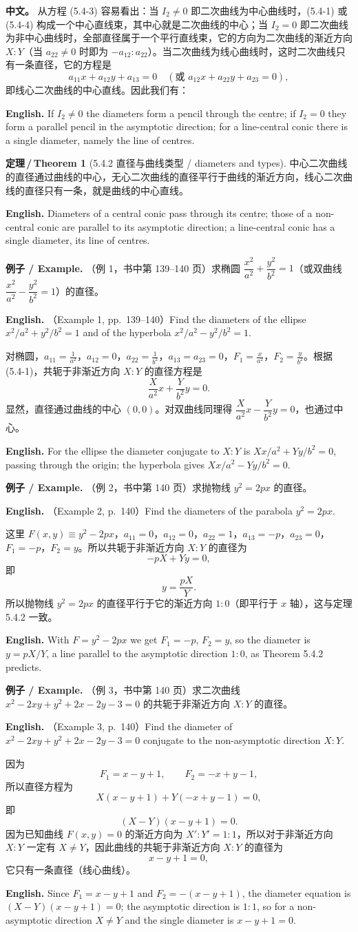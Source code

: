 \documentclass[UTF8,11pt,a4paper]{ctexart}
\newcommand{\APS}[2]{\par\noindent\textbf{中文。} #1\par\noindent\textbf{English.} #2\par\smallskip}
\newcommand{\EN}[1]{\par\noindent \textbf{English.} #1\par}
\newcommand{\EX}[2]{\par\noindent \textbf{例子 / Example.} #1\par\EN{#2}}
\theoremstyle{definition}
\newtheorem*{theorem}{定理\,/\,Theorem}
\begin{document}
\APS{从方程 (5.4-3) 容易看出：当 $I_2\ne0$ 即二次曲线为中心曲线时，(5.4-1) 或 (5.4-4) 构成一个中心直线束，其中心就是二次曲线的中心；当 $I_2=0$ 即二次曲线为非中心曲线时，全部直径属于一个平行直线束，它的方向为二次曲线的渐近方向 $X:Y$（当 $a_{22}\ne0$ 时即为 $-a_{12}:a_{22}$）。当二次曲线为线心曲线时，这时二次曲线只有一条直径，它的方程是
\[
a_{11}x+a_{12}y+a_{13}=0\quad(\text{或 } a_{12}x+a_{22}y+a_{23}=0),
\]
即线心二次曲线的中心直线。因此我们有：}{If $I_2\ne0$ the diameters form a pencil through the centre; if $I_2=0$ they form a parallel pencil in the asymptotic direction; for a line-central conic there is a single diameter, namely the line of centres.}

\begin{theorem}[5.4.2 直径与曲线类型 / diameters and types]\label{thm:diamtype}
中心二次曲线的直径通过曲线的中心，无心二次曲线的直径平行于曲线的渐近方向，线心二次曲线的直径只有一条，就是曲线的中心直线。
\EN{Diameters of a central conic pass through its centre; those of a non-central conic are parallel to its asymptotic direction; a line-central conic has a single diameter, its line of centres.}
\end{theorem}

\EX{（例 1，书中第 139--140 页）求椭圆 $\dfrac{x^2}{a^2}+\dfrac{y^2}{b^2}=1$（或双曲线 $\dfrac{x^2}{a^2}-\dfrac{y^2}{b^2}=1$）的直径。}{（Example 1, pp.~139--140）Find the diameters of the ellipse $x^2/a^2+y^2/b^2=1$ and of the hyperbola $x^2/a^2-y^2/b^2=1$.}
对椭圆，$a_{11}=\frac1{a^2}$，$a_{12}=0$，$a_{22}=\frac1{b^2}$，$a_{13}=a_{23}=0$，$F_1=\frac{x}{a^2}$，$F_2=\frac{y}{b^2}$。根据 (5.4-1)，共轭于非渐近方向 $X:Y$ 的直径方程是
\[
\frac{X}{a^2}x+\frac{Y}{b^2}y=0.
\]
显然，直径通过曲线的中心 $(0,0)$。对双曲线同理得 $\dfrac{X}{a^2}x-\dfrac{Y}{b^2}y=0$，也通过中心。
\EN{For the ellipse the diameter conjugate to $X:Y$ is $Xx/a^2+Yy/b^2=0$, passing through the origin; the hyperbola gives $Xx/a^2-Yy/b^2=0$.}

\EX{（例 2，书中第 140 页）求抛物线 $y^2=2px$ 的直径。}{（Example 2, p.~140）Find the diameters of the parabola $y^2=2px$.}
这里 $F(x,y)\equiv y^2-2px$，$a_{11}=0$，$a_{12}=0$，$a_{22}=1$，$a_{13}=-p$，$a_{23}=0$，$F_1=-p$，$F_2=y$。所以共轭于非渐近方向 $X:Y$ 的直径为
\[
-pX+Yy=0,
\]
即
\[
y=\frac{pX}{Y}.
\]
所以抛物线 $y^2=2px$ 的直径平行于它的渐近方向 $1:0$（即平行于 $x$ 轴），这与定理 5.4.2 一致。
\EN{With $F=y^2-2px$ we get $F_1=-p$, $F_2=y$, so the diameter is $y=pX/Y$, a line parallel to the asymptotic direction $1:0$, as Theorem 5.4.2 predicts.}

\EX{（例 3，书中第 140 页）求二次曲线 $x^2-2xy+y^2+2x-2y-3=0$ 的共轭于非渐近方向 $X:Y$ 的直径。}{（Example 3, p.~140）Find the diameter of $x^2-2xy+y^2+2x-2y-3=0$ conjugate to the non-asymptotic direction $X:Y$.}
因为
\[
F_1=x-y+1,\qquad F_2=-x+y-1,
\]
所以直径方程为
\[
X(x-y+1)+Y(-x+y-1)=0,
\]
即
\[
(X-Y)(x-y+1)=0.
\]
因为已知曲线 $F(x,y)=0$ 的渐近方向为 $X':Y'=1:1$，所以对于非渐近方向 $X:Y$ 一定有 $X\ne Y$，因此曲线的共轭于非渐近方向 $X:Y$ 的直径为
\[
x-y+1=0,
\]
它只有一条直径（线心曲线）。
\EN{Since $F_1=x-y+1$ and $F_2=-(x-y+1)$, the diameter equation is $(X-Y)(x-y+1)=0$; the asymptotic direction is $1:1$, so for a non-asymptotic direction $X\ne Y$ and the single diameter is $x-y+1=0$.}
\end{document}
